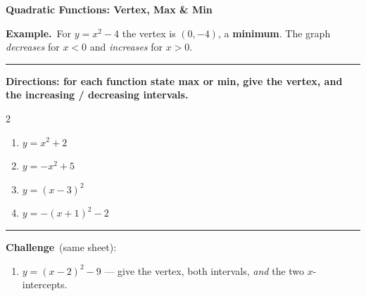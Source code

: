 \documentclass[12pt]{article}
\begin{document}
\vspace{0.35cm}

\begin{center}{\Large\textbf{Quadratic Functions: Vertex, Max \& Min}}\end{center}
\vspace{0.1cm}

\textbf{Example.}\ For $y=x^{2}-4$ the vertex is $(0,-4)$, a \textbf{minimum}. The graph \emph{decreases} for $x<0$ and \emph{increases} for $x>0$.\\[3pt]
\begin{center}
\end{center}
\vspace{0.1cm}\hrule\vspace{0.35cm}

\textbf{Directions: for each function state max or min, give the vertex, and the increasing / decreasing intervals.}\\[6pt]
\begin{multicols}{2}
\begin{enumerate}[label=\textbf{\arabic*.},itemsep=2.4cm]
\item $y=x^{2}+2$
\item $y=-x^{2}+5$
\item $y=(x-3)^{2}$
\item $y=-(x+1)^{2}-2$
\end{enumerate}
\end{multicols}

\vspace{0.1cm}\hrule\vspace{0.3cm}
\textbf{Challenge}\ (same sheet):\\[4pt]
\begin{enumerate}[label=\textbf{\arabic*.},start=5,itemsep=2.2cm]
\item $y=(x-2)^{2}-9$ --- give the vertex, both intervals, \emph{and} the two $x$-intercepts.
\end{enumerate}
\end{document}
